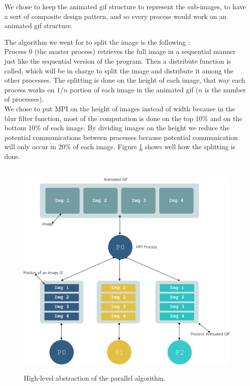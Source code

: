 \documentclass[11pt]{article}
\begin{document}
We chose to keep the animated gif structure to represent the sub-images, to have a sort of composite design pattern, and so every process would work on an animated gif structure.

The algorithm we went for to split the image is the following : \\
Process 0 (the master process) retrieves the full image in a sequential manner just like the sequential version of the program. Then a distribute function is called, which will be in charge to split the image and distribute it among the other processes. The splitting is done on the height of each image, that way each process works on $1/n$ portion of each image in the animated gif ($n$ is the number of processes). \\
We chose to put MPI on the height of images instead of width because in the blur filter function, most of the computation is done on the top 10\% and on the bottom 10\% of each image. By dividing images on the height we reduce the potential communications between processes because potential communication will only occur in 20\% of each image.
Figure \ref{fig:overview} shows well how the splitting is done. \\
\\
\begin{figure}[H]
	\centering
	\includegraphics[scale=0.45]{INF560-Image-Filtering-EPS.eps}
	\label{fig:overview}
	\caption{High-level abstraction of the parallel algorithm.}
\end{figure}
\end{document}
